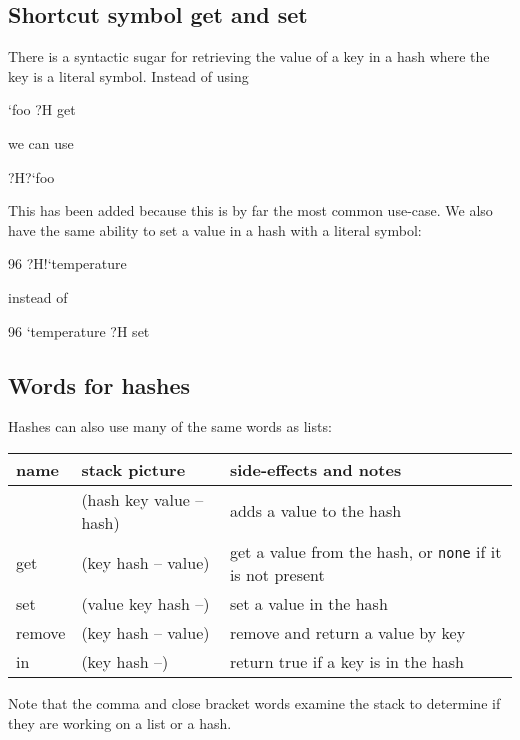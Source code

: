 \subsection{Shortcut symbol get and set}
There is a syntactic sugar for retrieving the value of a key in
a hash where the key is a literal symbol. Instead of using
\begin{v}
`foo ?H get
\end{v}
we can use
\begin{v}
?H?`foo
\end{v}
This has been added because this is by far the most common use-case.
We also have the same ability to set a value in a hash with a literal
symbol:
\begin{v}
96 ?H!`temperature
\end{v}
instead of
\begin{v}
96 `temperature ?H set
\end{v}

\subsection{Words for hashes}
Hashes can also use many of the same words as lists:
\indw{[\%}\indw{,}
\begin{center}
\begin{tabular}{|l|l|p{4in}|}\hline
\textbf{name} & \textbf{stack picture} & \textbf{side-effects and notes}\\ \hline
[\%    & (-- hash)    & creates a new hash\\
,    & (hash key value -- hash) & adds a value to the hash\\
]    & (hash key value -- hash) & adds a value to the hash\\
get & (key hash -- value) & get a value from the hash, or \texttt{none} if it is not present\\
set & (value key hash --) & set a value in the hash\\
remove & (key hash -- value) & remove and return a value by key\\
in & (key hash --) & return true if a key is in the hash\\
\hline
\end{tabular}
\end{center}
Note that the comma and close bracket words examine the stack to
determine if they are working on a list or a hash.

